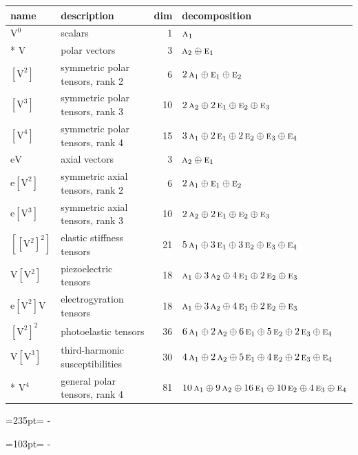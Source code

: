 \documentclass[10pt,a4paper]{article}
\newcommand{\needspace}[1]{\par\penalty-100\begingroup\dimen0=#1\relax\dimen2=\pagegoal
  \advance\dimen2-\pagetotal\ifdim\dimen0>\dimen2\relax\ifdim\dimen2>0pt\vfil\break\fi\fi
  \endgroup}
\numberwithin{equation}{section}
\newcommand{\irr}[1]{\text{\normalfont\scshape #1}}
\newcommand{\jahn}[1]{\mathrm{#1}}
\newlength{\fillwidth}\newlength{\cellwidth}\newlength{\colwidth}
\begin{document}
{\begin{longtable}{@{}llr>{\RaggedRight\arraybackslash}p{\fillwidth}@{}}
name & description & dim & decomposition\\\midrule\endhead
\bottomrule\endfoot\endlastfoot
$\jahn{V^{0}}$ & scalars & 1 & $\irr{a}_{1}$\\*
$\jahn{V}$ & polar vectors & 3 & $\irr{a}_{2} \oplus\allowbreak \irr{e}_{1}$\\
$\jahn{[V^{2}]}$ & symmetric polar tensors, rank 2 & 6 & $2\,\irr{a}_{1} \oplus\allowbreak \irr{e}_{1} \oplus\allowbreak \irr{e}_{2}$\\
$\jahn{[V^{3}]}$ & symmetric polar tensors, rank 3 & 10 & $2\,\irr{a}_{2} \oplus\allowbreak 2\,\irr{e}_{1} \oplus\allowbreak \irr{e}_{2} \oplus\allowbreak \irr{e}_{3}$\\
$\jahn{[V^{4}]}$ & symmetric polar tensors, rank 4 & 15 & $3\,\irr{a}_{1} \oplus\allowbreak 2\,\irr{e}_{1} \oplus\allowbreak 2\,\irr{e}_{2} \oplus\allowbreak \irr{e}_{3} \oplus\allowbreak \irr{e}_{4}$\\
$\jahn{eV}$ & axial vectors & 3 & $\irr{a}_{2} \oplus\allowbreak \irr{e}_{1}$\\
$\jahn{e[V^{2}]}$ & symmetric axial tensors, rank 2 & 6 & $2\,\irr{a}_{1} \oplus\allowbreak \irr{e}_{1} \oplus\allowbreak \irr{e}_{2}$\\
$\jahn{e[V^{3}]}$ & symmetric axial tensors, rank 3 & 10 & $2\,\irr{a}_{2} \oplus\allowbreak 2\,\irr{e}_{1} \oplus\allowbreak \irr{e}_{2} \oplus\allowbreak \irr{e}_{3}$\\
$\jahn{[[V^{2}]^{2}]}$ & elastic stiffness tensors & 21 & $5\,\irr{a}_{1} \oplus\allowbreak 3\,\irr{e}_{1} \oplus\allowbreak 3\,\irr{e}_{2} \oplus\allowbreak \irr{e}_{3} \oplus\allowbreak \irr{e}_{4}$\\
$\jahn{V[V^{2}]}$ & piezoelectric tensors & 18 & $\irr{a}_{1} \oplus\allowbreak 3\,\irr{a}_{2} \oplus\allowbreak 4\,\irr{e}_{1} \oplus\allowbreak 2\,\irr{e}_{2} \oplus\allowbreak \irr{e}_{3}$\\
$\jahn{e[V^{2}]V}$ & electrogyration tensors & 18 & $\irr{a}_{1} \oplus\allowbreak 3\,\irr{a}_{2} \oplus\allowbreak 4\,\irr{e}_{1} \oplus\allowbreak 2\,\irr{e}_{2} \oplus\allowbreak \irr{e}_{3}$\\
$\jahn{[V^{2}]^{2}}$ & photoelastic tensors & 36 & $6\,\irr{a}_{1} \oplus\allowbreak 2\,\irr{a}_{2} \oplus\allowbreak 6\,\irr{e}_{1} \oplus\allowbreak 5\,\irr{e}_{2} \oplus\allowbreak 2\,\irr{e}_{3} \oplus\allowbreak \irr{e}_{4}$\\
$\jahn{V[V^{3}]}$ & third-harmonic susceptibilities & 30 & $4\,\irr{a}_{1} \oplus\allowbreak 2\,\irr{a}_{2} \oplus\allowbreak 5\,\irr{e}_{1} \oplus\allowbreak 4\,\irr{e}_{2} \oplus\allowbreak 2\,\irr{e}_{3} \oplus\allowbreak \irr{e}_{4}$\\*
$\jahn{V^{4}}$ & general polar tensors, rank 4 & 81 & $10\,\irr{a}_{1} \oplus\allowbreak 9\,\irr{a}_{2} \oplus\allowbreak 16\,\irr{e}_{1} \oplus\allowbreak 10\,\irr{e}_{2} \oplus\allowbreak 4\,\irr{e}_{3} \oplus\allowbreak \irr{e}_{4}$\\
\bottomrule\end{longtable}}
\needspace{235pt}
\needspace{103pt}
\end{document}

